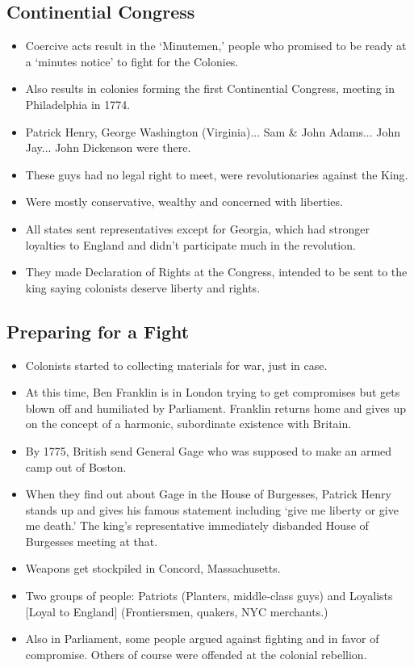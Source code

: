 \documentclass{article}
\begin{document}
    \subsection{Continential Congress}
      \begin{itemize}
        \item Coercive acts result in the `Minutemen,' people who promised to be ready at a `minutes notice' to fight for the Colonies.
        \item Also results in colonies forming the first Continential Congress, meeting in Philadelphia in 1774.
        \item Patrick Henry, George Washington (Virginia)... Sam \& John Adams... John Jay... John Dickenson were there.
        \item These guys had no legal right to meet, were revolutionaries against the King.
        \item Were mostly conservative, wealthy and concerned with liberties.
        \item All states sent representatives except for Georgia, which had stronger loyalties to England and didn't participate much in the revolution.
        \item They made Declaration of Rights at the Congress, intended to be sent to the king saying colonists deserve liberty and rights.
      \end{itemize}

    \subsection{Preparing for a Fight}
      \begin{itemize}
        \item Colonists started to collecting materials for war, just in case.
        \item At this time, Ben Franklin is in London trying to get compromises but gets blown off and humiliated by Parliament. Franklin returns home and gives up on the concept of a harmonic, subordinate existence with Britain.
        \item By 1775, British send General Gage who was supposed to make an armed camp out of Boston.
        \item When they find out about Gage in the House of Burgesses, Patrick Henry stands up and gives his famous statement including `give me liberty or give me death.' The king's representative immediately disbanded House of Burgesses meeting at that.
        \item Weapons get stockpiled in Concord, Massachusetts.
        \item Two groups of people: Patriots (Planters, middle-class guys) and Loyalists [Loyal to England] (Frontiersmen, quakers, NYC merchants.)
        \item Also in Parliament, some people argued against fighting and in favor of compromise. Others of course were offended at the colonial rebellion. 
      \end{itemize}
\end{document}
